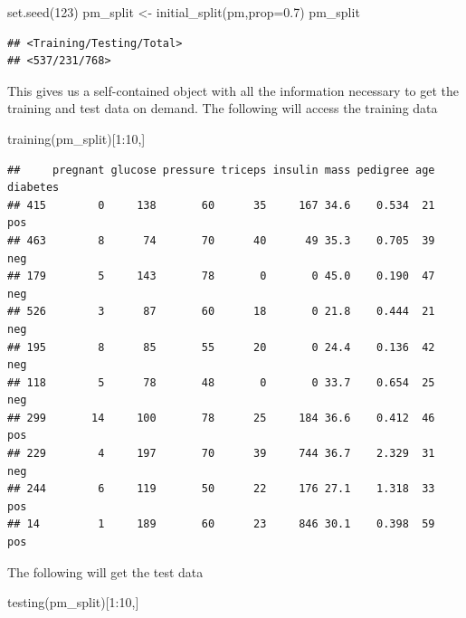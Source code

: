 \documentclass[
]{article}
\newenvironment{Shaded}{\begin{snugshade}}{\end{snugshade}}
\newcommand{\AttributeTok}[1]{\textcolor[rgb]{0.77,0.63,0.00}{#1}}
\newcommand{\DecValTok}[1]{\textcolor[rgb]{0.00,0.00,0.81}{#1}}
\newcommand{\FloatTok}[1]{\textcolor[rgb]{0.00,0.00,0.81}{#1}}
\newcommand{\FunctionTok}[1]{\textcolor[rgb]{0.00,0.00,0.00}{#1}}
\newcommand{\NormalTok}[1]{#1}
\newcommand{\OtherTok}[1]{\textcolor[rgb]{0.56,0.35,0.01}{#1}}
\newcommand{\SpecialCharTok}[1]{\textcolor[rgb]{0.00,0.00,0.00}{#1}}
\begin{document}
\begin{Shaded}
\begin{Highlighting}[]
\FunctionTok{set.seed}\NormalTok{(}\DecValTok{123}\NormalTok{)}
\NormalTok{pm\_split }\OtherTok{\textless{}{-}} \FunctionTok{initial\_split}\NormalTok{(pm,}\AttributeTok{prop=}\FloatTok{0.7}\NormalTok{)}
\NormalTok{pm\_split}
\end{Highlighting}
\end{Shaded}

\begin{verbatim}
## <Training/Testing/Total>
## <537/231/768>
\end{verbatim}

This gives us a self-contained object with all the information necessary
to get the training and test data on demand. The following will access
the training data

\begin{Shaded}
\begin{Highlighting}[]
\FunctionTok{training}\NormalTok{(pm\_split)[}\DecValTok{1}\SpecialCharTok{:}\DecValTok{10}\NormalTok{,]}
\end{Highlighting}
\end{Shaded}

\begin{verbatim}
##     pregnant glucose pressure triceps insulin mass pedigree age diabetes
## 415        0     138       60      35     167 34.6    0.534  21      pos
## 463        8      74       70      40      49 35.3    0.705  39      neg
## 179        5     143       78       0       0 45.0    0.190  47      neg
## 526        3      87       60      18       0 21.8    0.444  21      neg
## 195        8      85       55      20       0 24.4    0.136  42      neg
## 118        5      78       48       0       0 33.7    0.654  25      neg
## 299       14     100       78      25     184 36.6    0.412  46      pos
## 229        4     197       70      39     744 36.7    2.329  31      neg
## 244        6     119       50      22     176 27.1    1.318  33      pos
## 14         1     189       60      23     846 30.1    0.398  59      pos
\end{verbatim}

The following will get the test data

\begin{Shaded}
\begin{Highlighting}[]
\FunctionTok{testing}\NormalTok{(pm\_split)[}\DecValTok{1}\SpecialCharTok{:}\DecValTok{10}\NormalTok{,]}
\end{Highlighting}
\end{Shaded}
\end{document}
